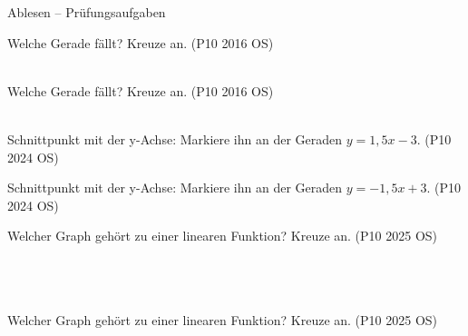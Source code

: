 \setcounter{aufgabe}{0}

\begin{aufgabe}{Ablesen – Prüfungsaufgaben}
\begin{teile}
\teil Welche Gerade fällt? Kreuze an. \hfill (P10 2016 OS) \\  \\ 

\begin{ksys}[xmin=-5,xmax=5,ymin=-5,ymax=5,ablesen]   \end{ksys}
\teil Welche Gerade fällt? Kreuze an. \hfill (P10 2016 OS) \\  \\ 

\begin{ksys}[xmin=-5,xmax=5,ymin=-5,ymax=5,ablesen]   \end{ksys}
\teil Schnittpunkt mit der y-Achse: Markiere ihn an der Geraden $y = 1{,}5x - 3$. \hfill (P10 2024 OS)

\begin{ksys}[xmin=-5,xmax=5,ymin=-5,ymax=5,ablesen]  \end{ksys}
\teil Schnittpunkt mit der y-Achse: Markiere ihn an der Geraden $y = -1{,}5x + 3$. \hfill (P10 2024 OS)

\begin{ksys}[xmin=-5,xmax=5,ymin=-5,ymax=5,ablesen]  \end{ksys}
\teil Welcher Graph gehört zu einer linearen Funktion? Kreuze an. \hfill (P10 2025 OS) \\  \\  \\  \\ 

\begin{ksys}[xmin=-5,xmax=5,ymin=-5,ymax=5,ablesen]     \end{ksys}
\teil Welcher Graph gehört zu einer linearen Funktion? Kreuze an. \hfill (P10 2025 OS) \\  \\  \\  \\ 

\begin{ksys}[xmin=-5,xmax=5,ymin=-5,ymax=5,ablesen]     \end{ksys}
\end{teile}
\end{aufgabe}

